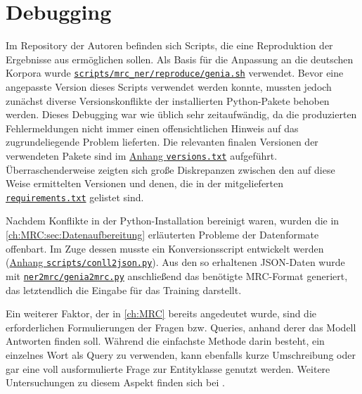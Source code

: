 \section{Debugging}
\label{ch:Training:sec:Debugging}

Im Repository der Autoren befinden sich Scripts, die eine Reproduktion der Ergebnisse aus \cite{li2019unified} ermöglichen sollen. Als Basis für die Anpassung an die deutschen Korpora wurde \href{https://github.com/ShannonAI/mrc-for-flat-nested-ner/blob/457b0759f7fd462d0abd0a23441726352716fff9/scripts/mrc_ner/reproduce/genia.sh}{\texttt{scripts/mrc\_ner/reproduce/genia.sh}} verwendet. Bevor eine angepasste Version dieses Scripts verwendet werden konnte, mussten jedoch zunächst diverse Versionskonflikte der installierten Python-Pakete behoben werden. Dieses Debugging war wie üblich sehr zeitaufwändig, da die produzierten Fehlermeldungen nicht immer einen offensichtlichen Hinweis auf das zugrundeliegende Problem lieferten. Die relevanten finalen Versionen der verwendeten Pakete sind im \hyperref[app:versions]{Anhang \texttt{versions.txt}} aufgeführt. Überraschenderweise zeigten sich große Diskrepanzen zwischen den auf diese Weise ermittelten Versionen und denen, die in der mitgelieferten \href{https://github.com/ShannonAI/mrc-for-flat-nested-ner/blob/457b0759f7fd462d0abd0a23441726352716fff9/requirements.txt}{\texttt{requirements.txt}} gelistet sind.

Nachdem Konflikte in der Python-Installation bereinigt waren, wurden die in \autoref{ch:MRC:sec:Datenaufbereitung} erläuterten Probleme der Datenformate offenbart. Im Zuge dessen musste ein Konversionsscript entwickelt werden (\hyperref[app:conll2json]{Anhang \texttt{scripts/conll2json.py}}). Aus den so erhaltenen JSON-Daten wurde mit \href{https://github.com/ShannonAI/mrc-for-flat-nested-ner/blob/457b0759f7fd462d0abd0a23441726352716fff9/ner2mrc/genia2mrc.py}{\texttt{ner2mrc/genia2mrc.py}} anschließend das benötigte MRC-Format generiert, das letztendlich die Eingabe für das Training darstellt.

Ein weiterer Faktor, der in \autoref{ch:MRC} bereits angedeutet wurde, sind die erforderlichen Formulierungen der Fragen bzw. Queries, anhand derer das Modell Antworten finden soll. Während die einfachste Methode darin besteht, ein einzelnes Wort als Query zu verwenden, kann ebenfalls kurze Umschreibung oder gar eine voll ausformulierte Frage zur Entityklasse genutzt werden. Weitere Untersuchungen zu diesem Aspekt finden sich bei \cite{li2019unified}.

